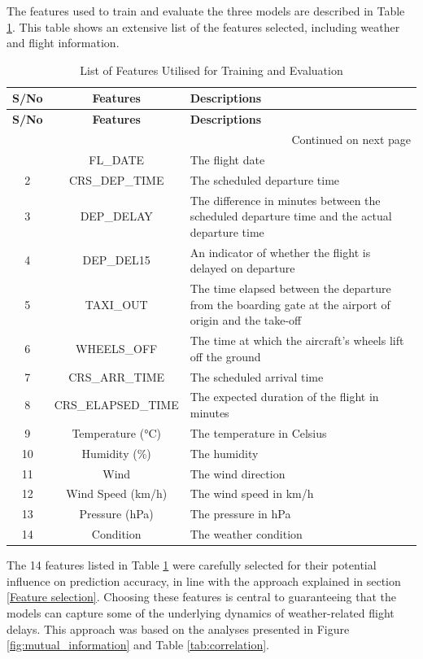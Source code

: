 \documentclass[12pt,oneside]{book} %
\begin{document}
\noindent The features used to train and evaluate the three models are described in Table \ref{tab:features}. This table shows an extensive list of the features selected, including weather and flight information.

\setlength\LTleft{2cm}
\begin{longtable}{c c p{6cm} }
\caption{List of Features Utilised for Training and Evaluation} \label{tab:features}  \\

\hline
\textbf{S/No} & \textbf{Features} & \textbf{Descriptions}\\ \hline
\endfirsthead

\hline
\textbf{S/No} & \textbf{Features} & \textbf{Descriptions} \\ \hline
\endhead

\hline \multicolumn{3}{r}{{Continued on next page}} \\ \hline
\endfoot

\hline
\endlastfoot
1 & FL\_DATE & The flight date\\ 
2 & CRS\_DEP\_TIME & The scheduled departure time\\ 
3 & DEP\_DELAY & The difference in minutes between the scheduled departure time and the actual departure time\\ 
4 & DEP\_DEL15 & An indicator of whether the flight is delayed on departure\\ 
5 & TAXI\_OUT & The time elapsed between the departure from the boarding gate at the airport of origin and the take-off\\ 
6 & WHEELS\_OFF & The time at which the aircraft's wheels lift off the ground\\ 
7 & CRS\_ARR\_TIME & The scheduled arrival time\\ 
8 & CRS\_ELAPSED\_TIME & The expected duration of the flight in minutes\\ 
9 & Temperature (°C) & The temperature in Celsius\\  
10 & Humidity (\%) & The humidity\\ 
11 & Wind & The wind direction\\ 
12 & Wind Speed (km/h) & The wind speed in km/h\\ 
13 & Pressure (hPa) & The pressure in hPa\\  
14 & Condition & The weather condition\\ 
\end{longtable}

\noindent The 14 features listed in Table \ref{tab:features} were carefully selected for their potential influence on prediction accuracy, in line with the approach explained in section \ref{Feature selection}. Choosing these features is central to guaranteeing that the models can capture some of the underlying dynamics of weather-related flight delays. This approach was based on the analyses presented in Figure \ref{fig:mutual_information} and Table \ref{tab:correlation}.
\end{document}
